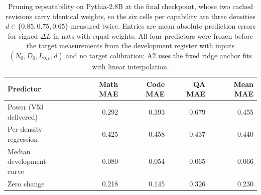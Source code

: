 \begin{table}[!htbp]\normalfont
\centering\footnotesize
\begin{tabular*}{\textwidth}{@{\extracolsep{\fill}}lrrrr@{}}
\toprule
Predictor & Math MAE & Code MAE & QA MAE & Mean MAE \\
\midrule
\shortstack[l]{Power (V53\\delivered)} & 0.292 & 0.393 & 0.679 & 0.455 \\
\shortstack[l]{Per-density\\regression} & 0.425 & 0.458 & 0.437 & 0.440 \\
\shortstack[l]{Median development\\curve} & 0.080 & 0.054 & 0.065 & 0.066 \\
Zero change & 0.218 & 0.145 & 0.326 & 0.230 \\
\bottomrule
\end{tabular*}
\caption{Pruning repeatability on Pythia-2.8B at the final checkpoint, whose two cached revisions carry identical weights, so the six cells per capability are three densities $d\in\{0.85,0.75,0.65\}$ measured twice. Entries are mean absolute prediction errors for signed $\Delta L$ in nats with equal weights. All four predictors were frozen before the target measurements from the development register with inputs $(N_0,D_0,L_{0,c},d)$ and no target calibration; A2 uses the fixed ridge anchor fits with linear interpolation.}
\label{tab:prune_repeat}
\end{table}
